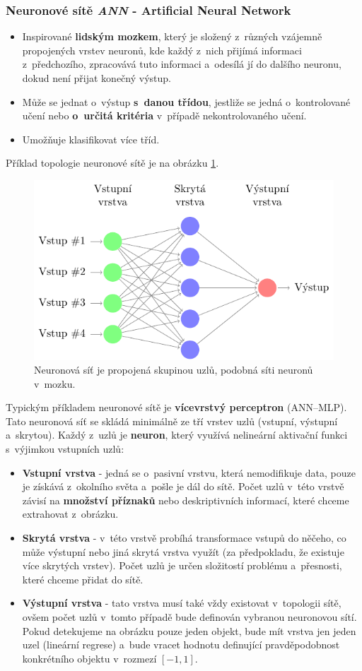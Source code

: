 \subsubsection{Neuronové sítě \textit{ANN} - Artificial Neural Network}
\begin{itemize}
	\item Inspirované \textbf{lidským mozkem}, který je složený z~různých vzájemně propojených vrstev neuronů, kde každý z~nich přijímá informaci z~předchozího, zpracovává tuto informaci a~odesílá jí do dalšího neuronu, dokud není přijat konečný výstup.
	\item Může se jednat o~výstup \textbf{s~danou třídou}, jestliže se jedná o~kontrolované učení nebo \textbf{o~určitá kritéria} v~případě nekontrolovaného učení.
	\item Umožňuje klasifikovat více tříd.
\end{itemize}
Příklad topologie neuronové sítě je na obrázku \ref{fig:ann}. 
\begin{figure}[H]
	\centering
	\includegraphics[width=.6\linewidth]{assets/9_ann.pdf}
	\caption{Neuronová síť je propojená skupinou uzlů, podobná síti neuronů v~mozku.}
	\label{fig:ann}
\end{figure}

Typickým příkladem neuronové sítě je \textbf{vícevrstvý perceptron} (ANN--MLP). Tato neuronová síť se skládá minimálně ze tří vrstev uzlů (vstupní, výstupní a~skrytou). Každý z~uzlů je \textbf{neuron}, který využívá nelineární aktivační funkci s~výjimkou vstupních uzlů:
\begin{itemize}
	\item{\textbf{Vstupní vrstva} - jedná se o~pasivní vrstvu, která nemodifikuje data, pouze je získává z~okolního světa a~pošle je dál do sítě. Počet uzlů v~této vrstvě závisí na \textbf{množství příznaků} nebo deskriptivních informací, které chceme extrahovat z~obrázku.}
	\item{\textbf{Skrytá vrstva} - v~této vrstvě probíhá transformace vstupů do něčeho, co může výstupní nebo jiná skrytá vrstva využít (za předpokladu, že existuje více skrytých vrstev). Počet uzlů je určen složitostí problému a~přesnosti, které chceme přidat do sítě.}
	\item{\textbf{Výstupní vrstva} - tato vrstva musí také vždy existovat v~topologii sítě, ovšem počet uzlů v~tomto případě bude definován vybranou neuronovou sítí. Pokud detekujeme na obrázku pouze jeden objekt, bude mít vrstva jen jeden uzel (lineární regrese) a~bude vracet hodnotu definující pravděpodobnost konkrétního objektu v~rozmezí $[-1,1]$.}
\end{itemize} 

